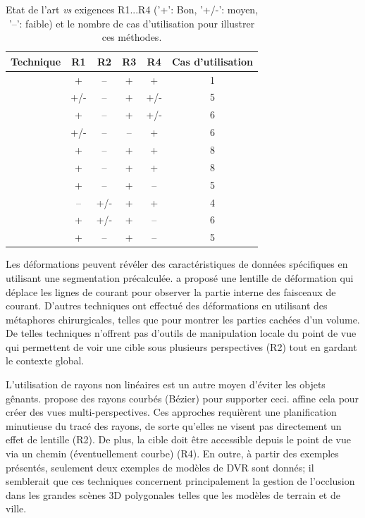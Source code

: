 \begin{table}
\centering
\small
\begin{tabular}{ |c|c|c|c|c|c| }
\hline
\textbf{Technique} & \textbf{R1} & \textbf{R2} & \textbf{R3} & \textbf{R4} & \textbf{Cas d'utilisation}\\
\hline
\hline
\cite{1250400} & + & -- & + & + & 1\\
\cite{Sonnet:2004:IEA:989863.989871} & +/- & -- & + & +/- & 5\\
\cite{1532818} & + & -- & + & +/- & 6\\
\cite{4015467} & +/- & -- & -- & + & 6\\
\cite{Correa:2006:FAV:1187627.1187827} & + & -- & + & + & 8\\
\cite{Correa:2007:IDD:1313046.1313163} & + & -- & + & + & 8\\
\cite{5613463} & + & -- & + & -- & 5\\
\cite{Hsu:2011:RFM:2070781.2024165} & -- & +/- & + & + & 4\\
\cite{6787171} & + & +/- & + & -- & 6\\
\cite{7120994} & + & -- & + & -- & 5\\
\hline
\end{tabular}
\caption{Etat de l'art \emph{vs} exigences R1...R4 ('+': Bon, '+/-': moyen, '--': faible) et le nombre de cas d'utilisation pour illustrer ces méthodes.}
\label{tab:methodsfr}
\end{table}

Les déformations peuvent révéler des caractéristiques de données spécifiques en utilisant une segmentation précalculée. \cite{7332955} a proposé une lentille de déformation qui déplace les lignes de courant pour observer la partie interne des faisceaux de courant. D'autres techniques ont effectué des déformations en utilisant des métaphores chirurgicales, telles que \cite{4069230, Correa:2006:FAV:1187627.1187827} pour montrer les parties cachées d'un volume. De telles techniques n'offrent pas d'outils de manipulation locale du point de vue qui permettent de voir une cible sous plusieurs perspectives (R2) tout en gardant le contexte global.

L'utilisation de rayons non linéaires est un autre moyen d'éviter les objets gênants. \cite{5613463} propose des rayons courbés (Bézier) pour supporter ceci. \cite{7120994} affine cela pour créer des vues multi-perspectives. Ces approches requièrent une planification minutieuse du tracé des rayons, de sorte qu'elles ne visent pas directement un effet de lentille (R2). De plus, la cible doit être accessible depuis le point de vue via un chemin (éventuellement courbe) (R4). En outre, à partir des exemples présentés, seulement deux exemples de modèles de DVR sont donnés; il semblerait que ces techniques concernent principalement la gestion de l'occlusion dans les grandes scènes 3D polygonales telles que les modèles de terrain et de ville.

